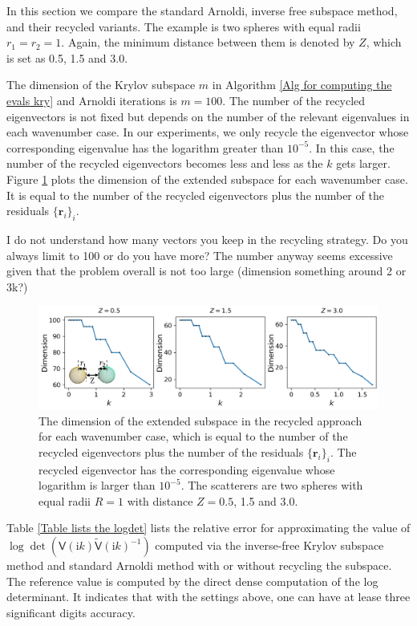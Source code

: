 In this section we compare the standard Arnoldi, inverse free subspace method, and their recycled variants. The example is 
two spheres with equal radii $r_{1} = r_{2} = 1$. Again, the minimum distance between them is denoted by $Z$, which is set as 0.5, 1.5 and 3.0. 

The dimension of the Krylov subspace $m$ in Algorithm \ref{Alg for computing the evals kry} and Arnoldi iterations
is $m = 100$. {\color{teal} The number of the recycled eigenvectors is not fixed but depends on the number of the relevant eigenvalues in each wavenumber case. 
In our experiments, we only recycle the eigenvector whose corresponding eigenvalue has the logarithm greater than $10^{-5}$. In this case, the number of the recycled
eigenvectors becomes less and less as the $k$ gets larger.  Figure \ref{Dimension_of_the_extended_subspace} plots the dimension of the extended subspace
for each wavenumber case. It is equal to the number of the recycled eigenvectors plus the number of the residuals $\{\mathbf{r}_{i}\}_{i}$.} 

{\color{red} I do not understand how many vectors you keep in the recycling strategy. Do you always limit to 100 or do you have more?
The number anyway seems excessive given that the problem overall is not too large (dimension something around 2 or 3k?)}

\begin{figure}[H]
    \centering
    \includegraphics[width = \textwidth]{figures/Dimension_of_the_extended_subspace.png}
    \caption{The dimension of the extended subspace in the recycled approach for each wavenumber case, which is equal to the number of the recycled 
    eigenvectors plus the number of the residuals $\{\mathbf{r}_{i}\}_{i}$. The recycled eigenvector has the corresponding eigenvalue whose logarithm
    is larger than $10^{-5}$.  The scatterers are two spheres with equal radii $R = 1$ with distance $Z = 0.5$, 1.5 and 3.0.}
    \label{Dimension_of_the_extended_subspace}
\end{figure}

Table \ref{Table lists the logdet} lists the relative error for approximating the value of $\log\det(\mathsf{V}(\mathrm{i}k)\tilde{\mathsf{V}}(\mathrm{i}k)^{-1})$ 
computed via the inverse-free Krylov subspace method and standard Arnoldi method with or without recycling the subspace. {\color{teal}The reference value is computed by the 
direct dense computation of the log determinant.} It indicates that with the settings above, one 
can have at lease three significant digits accuracy.
 
